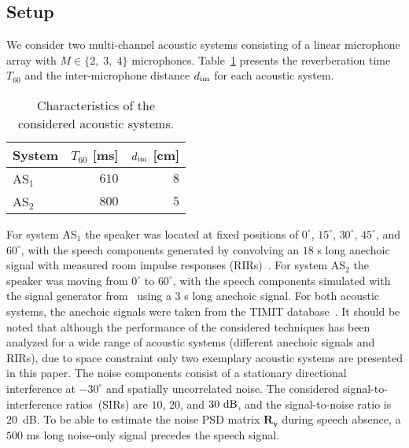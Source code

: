\documentclass{article}
\begin{document}
\subsection{Setup}
We consider two multi-channel acoustic systems consisting of a linear microphone array with $M \in \{ 2, \; 3, \; 4 \}$ microphones.
Table~\ref{tbl: ac_sys} presents the reverberation time $T_{60}$ and the inter-microphone distance $d_{\rm im}$ for each acoustic system.
\begin{table}[t!]
\begin{center}
  \caption{Characteristics of the considered acoustic systems.}
  \label{tbl: ac_sys}
  \begin{tabularx}{\linewidth}{Xrr}
    \toprule
    System & $T_{60}$ [ms] & $d_{\rm im}$ [cm] \\
    \midrule
    AS$_1$ & $610$ & $8$ \\
    AS$_2$ & $800$ & $5$ \\
    \bottomrule
  \end{tabularx}
\end{center}
\vspace{-0.6cm}
\end{table}
For system AS$_1$ the speaker was located at fixed positions of $0^{\circ}$, $15^{\circ}$, $30^{\circ}$, $45^{\circ}$, and $60^{\circ}$, with the speech components generated by convolving an $18$ s long anechoic signal with measured room impulse responses (RIRs)~\cite{hadad_IWAENC_2014}.
For system AS$_2$ the speaker was moving from $0^{\circ}$ to $60^{\circ}$, with the speech components simulated with the signal generator from~\cite{sg} using a $3$ s long anechoic signal.
For both acoustic systems, the anechoic signals were taken from the TIMIT database~\cite{timit}.
It should be noted that although the performance of the considered techniques has been analyzed for a wide range of acoustic systems (different anechoic signals and RIRs), due to space constraint only two exemplary acoustic systems are presented in this paper. 
The noise components consist of a stationary directional interference at $-30^{\circ}$ and spatially uncorrelated noise.
The considered signal-to-interference ratios~(SIRs) are $10$, $20$, and $30~{\rm dB}$, and the signal-to-noise ratio is $20$~dB.
To be able to estimate the noise PSD matrix $\mathbf{R}_{\mathbf{v}}$ during speech absence, a $500$ ms long noise-only signal precedes the speech signal.
\end{document}
